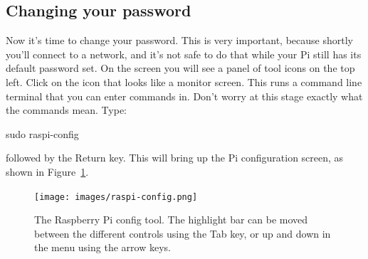 %
%
%
%
%
%

\subsection{Changing your password}
\label{configscreen}

Now it's time to change your password. This is very important, because
shortly you'll connect to a network, and it's not safe to do that
while your Pi still has its default password set.  On the screen you
will see a panel of tool icons on the top left. Click on the icon that
looks like a monitor screen. This runs a command line terminal that
you can enter commands in. Don't worry at this stage exactly what the
commands mean. Type:

\begin{ttoutenv}
sudo raspi-config
\end{ttoutenv}

followed by the Return key. This will bring up the Pi configuration screen, as shown in Figure~\ref{figure:raspi-config}.

\begin{figure}
\centerline{\texttt{[image: images/raspi-config.png]}}
\caption{The Raspberry Pi config tool. The highlight bar can be moved between the different controls using the Tab key, or up and down in the menu using the arrow keys.}\label{figure:raspi-config}
\end{figure}

